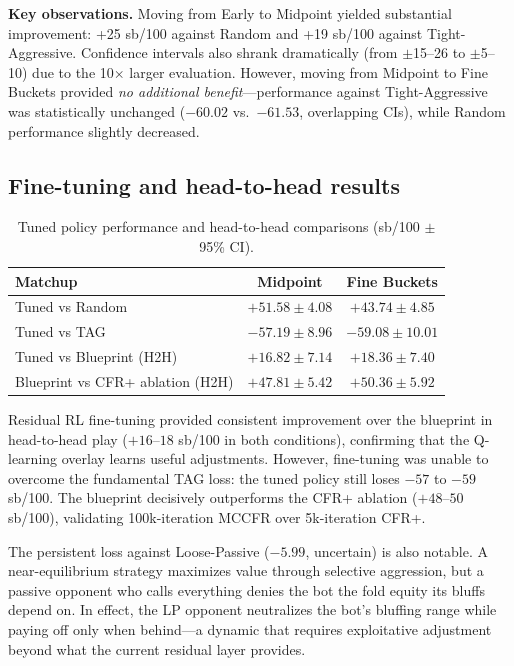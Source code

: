 \documentclass{article}
\begin{document}
\textbf{Key observations.} Moving from Early to Midpoint yielded substantial improvement: +25 sb/100 against Random and +19 sb/100 against Tight-Aggressive. Confidence intervals also shrank dramatically (from $\pm$15--26 to $\pm$5--10) due to the 10$\times$ larger evaluation. However, moving from Midpoint to Fine Buckets provided \textit{no additional benefit}---performance against Tight-Aggressive was statistically unchanged ($-60.02$ vs.\ $-61.53$, overlapping CIs), while Random performance slightly decreased.

\subsection{Fine-tuning and head-to-head results}

\begin{table}[h]
\centering
\caption{Tuned policy performance and head-to-head comparisons (sb/100 $\pm$ 95\% CI).}
\label{tab:tuned}
\begin{tabular}{@{}lcc@{}}
\toprule
\textbf{Matchup} & \textbf{Midpoint} & \textbf{Fine Buckets} \\
\midrule
Tuned vs Random       & $+51.58 \pm 4.08$ & $+43.74 \pm 4.85$ \\
Tuned vs TAG          & $-57.19 \pm 8.96$ & $-59.08 \pm 10.01$ \\
Tuned vs Blueprint (H2H) & $+16.82 \pm 7.14$ & $+18.36 \pm 7.40$ \\
Blueprint vs CFR+ ablation (H2H) & $+47.81 \pm 5.42$ & $+50.36 \pm 5.92$ \\
\bottomrule
\end{tabular}
\end{table}

Residual RL fine-tuning provided consistent improvement over the blueprint in head-to-head play ($+16$--$18$ sb/100 in both conditions), confirming that the Q-learning overlay learns useful adjustments. However, fine-tuning was unable to overcome the fundamental TAG loss: the tuned policy still loses $-57$ to $-59$ sb/100. The blueprint decisively outperforms the CFR+ ablation ($+48$--$50$ sb/100), validating 100k-iteration MCCFR over 5k-iteration CFR+.

The persistent loss against Loose-Passive ($-5.99$, uncertain) is also notable. A near-equilibrium strategy maximizes value through selective aggression, but a passive opponent who calls everything denies the bot the fold equity its bluffs depend on. In effect, the LP opponent neutralizes the bot's bluffing range while paying off only when behind---a dynamic that requires exploitative adjustment beyond what the current residual layer provides.
\end{document}
